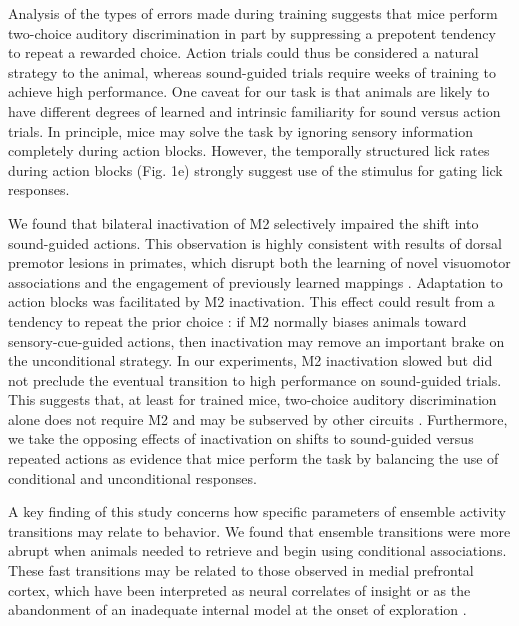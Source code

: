 Analysis of the types of errors made during training suggests that mice perform two-choice auditory discrimination in part by suppressing a prepotent tendency to repeat a rewarded choice. Action trials could thus be considered a natural strategy to the animal, whereas sound-guided trials require weeks of training to achieve high performance. One caveat for our task is that animals are likely to have different degrees of learned and intrinsic familiarity for sound versus action trials. In principle, mice may solve the task by ignoring sensory information completely during action blocks. However, the temporally structured lick rates during action blocks (Fig. 1e) strongly suggest use of the stimulus for gating lick responses. 

We found that bilateral inactivation of M2 selectively impaired the shift into sound-guided actions. This observation is highly consistent with results of dorsal premotor lesions in primates, which disrupt both the learning of novel visuomotor associations and the engagement of previously learned mappings \citep{petrides1985deficits,halsband1985premotor,nixon2004cortico}. Adaptation to action blocks was facilitated by M2 inactivation. This effect could result from a tendency to repeat the prior choice \citep{sul2011role}: if M2 normally biases animals toward sensory-cue-guided actions, then inactivation may remove an important brake on the unconditional strategy. In our experiments, M2 inactivation slowed but did not preclude the eventual transition to high performance on sound-guided trials. This suggests that, at least for trained mice, two-choice auditory discrimination alone does not require M2 and may be subserved by other circuits \citep{znamenskiy2013corticostriatal}. Furthermore, we take the opposing effects of inactivation on shifts to sound-guided versus repeated actions as evidence that mice perform the task by balancing the use of conditional and unconditional responses.

A key finding of this study concerns how specific parameters of ensemble activity transitions may relate to behavior. We found that ensemble transitions were more abrupt when animals needed to retrieve and begin using conditional associations. These fast transitions may be related to those observed in medial prefrontal cortex, which have been interpreted as neural correlates of insight \citep{durstewitz2010abrupt} or as the abandonment of an inadequate internal model at the onset of exploration \citep{karlsson2012network}. 


